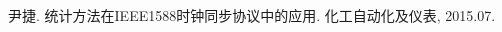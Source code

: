 
\begin{publications}{99}
    \item\textsc{尹捷}. {统计方法在IEEE1588时钟同步协议中的应用}. 化工自动化及仪表, 2015.07.
\end{publications}
